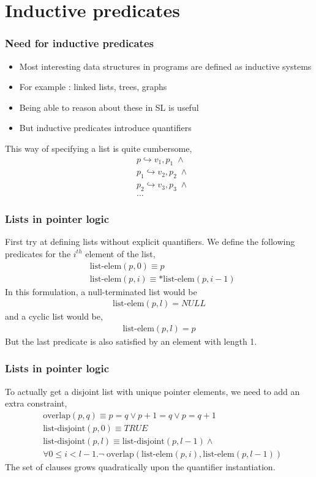 \documentclass{beamer}
\begin{document}
\section{Inductive predicates}
\begin{frame}
\frametitle{Need for inductive predicates}
\begin{itemize}
    \item Most interesting data structures in programs are defined as inductive systems
    \item For example : linked lists, trees, graphs
    \item Being able to reason about these in SL is useful
    \item But inductive predicates introduce quantifiers
\end{itemize}
	\vspace{0.5cm}
This way of specifying a list is quite cumbersome,
    \begin{align*}
        & p \hookrightarrow v_1,p_1 \; \land \\
        & p_1 \hookrightarrow v_2, p_2 \; \land \\
        & p_2 \hookrightarrow v_3, p_3 \; \land \\
        & \ldots
    \end{align*}
\end{frame}

\begin{frame}
\frametitle{Lists in pointer logic}
	First try at defining lists without explicit quantifiers. We define the following predicates for the $i^{th}$
element of the list,
\begin{align*}
	& \textrm{list-elem}(p,0) \equiv p \\
	& \textrm{list-elem}(p,i) \equiv *\textrm{list-elem}(p,i-1)
\end{align*}
In this formulation, a null-terminated list would be \\
\begin{align*} \textrm{list-elem}(p,l) = NULL
\end{align*}
and a cyclic list would be,
\begin{align*} \textrm{list-elem}(p,l) = p \end{align*}
But the last predicate is also satisfied by an element with length 1.
\end{frame}

\begin{frame}
\frametitle{Lists in pointer logic}
To actually get a disjoint list with unique pointer elements,
we need to add an extra constraint,
\begin{align*}
	& \textrm{overlap}(p,q) \equiv p = q \lor p + 1 = q \lor p = q + 1 \\
	& \textrm{list-disjoint}(p,0) \equiv TRUE \\
	& \textrm{list-disjoint}(p,l) \equiv
	\textrm{list-disjoint}(p,l-1) \land \\
	& \forall 0 \leq i < l - 1.
	\neg \; \textrm{overlap}(
	\textrm{list-elem}(p,i), \textrm{list-elem}(p,l-1))
\end{align*}
The set of clauses grows quadratically upon the quantifier instantiation.
\end{frame}
\end{document}
